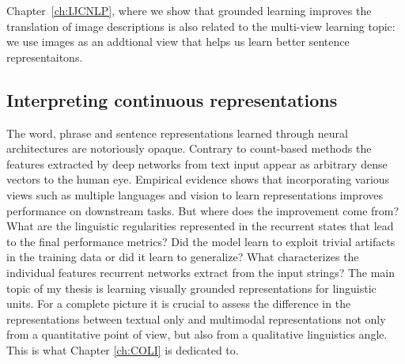 Chapter~\ref{ch:IJCNLP}, where we show that grounded learning improves the translation
of image descriptions is also related to the multi-view learning topic: we use
images as an addtional view that helps us learn better sentence representaitons.





\subsection{Interpreting continuous representations}
\label{sec:interpret}
The word, phrase and sentence representations learned through neural architectures are notoriously opaque.
Contrary to count-based methods the features extracted by deep networks from text input
appear as arbitrary dense vectors to the human eye.
Empirical evidence shows that incorporating various views such as multiple languages and vision to
learn representations improves performance on downstream tasks.
But where does the improvement come from? What are the linguistic
regularities represented in the recurrent states that lead to the final performance metrics?
Did the model learn to exploit trivial artifacts in the training data or did it learn to generalize?
What characterizes the individual features recurrent networks extract from the input strings?
The main topic of my thesis is learning visually grounded representations for linguistic units.
For a complete picture it is crucial to assess the difference in the representations
between textual only and multimodal representations not only from a quantitative point of view,
but also from a qualitative linguistics angle.
This is what Chapter \ref{ch:COLI} is dedicated to.

